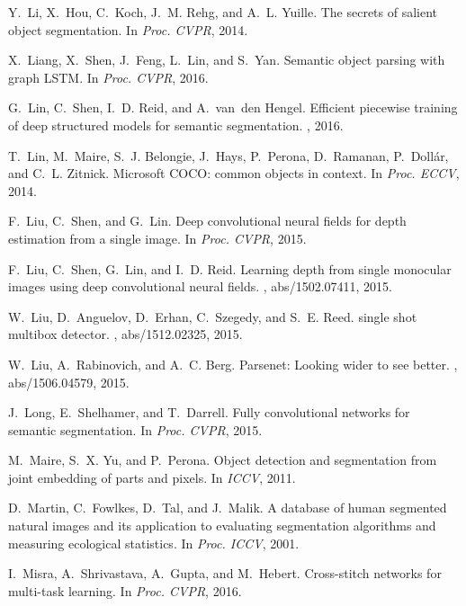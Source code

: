 \documentclass[10pt,twocolumn,letterpaper]{article}
\begin{document}
\begin{thebibliography}{100}
	Y.~Li, X.~Hou, C.~Koch, J.~M. Rehg, and A.~L. Yuille.
	\newblock The secrets of salient object segmentation.
	\newblock In {\em Proc. {CVPR}}, 2014.
	
	X.~Liang, X.~Shen, J.~Feng, L.~Lin, and S.~Yan.
	\newblock Semantic object parsing with graph {LSTM}.
	\newblock In {\em Proc. {CVPR}}, 2016.
	
	G.~Lin, C.~Shen, I.~D. Reid, and A.~van~den Hengel.
	\newblock Efficient piecewise training of deep structured models for semantic
	segmentation.
	, 2016.
	
	T.~Lin, M.~Maire, S.~J. Belongie, J.~Hays, P.~Perona, D.~Ramanan,
	P.~Doll{\'{a}}r, and C.~L. Zitnick.
	\newblock Microsoft {COCO:} common objects in context.
	\newblock In {\em Proc. {ECCV}}, 2014.
	
	F.~Liu, C.~Shen, and G.~Lin.
	\newblock Deep convolutional neural fields for depth estimation from a single
	image.
	\newblock In {\em Proc. {CVPR}}, 2015.
	
	F.~Liu, C.~Shen, G.~Lin, and I.~D. Reid.
	\newblock Learning depth from single monocular images using deep convolutional
	neural fields.
	, abs/1502.07411, 2015.
	
	W.~Liu, D.~Anguelov, D.~Erhan, C.~Szegedy, and S.~E. Reed.
	 single shot multibox detector.
	, abs/1512.02325, 2015.
	
	W.~Liu, A.~Rabinovich, and A.~C. Berg.
	\newblock Parsenet: Looking wider to see better.
	, abs/1506.04579, 2015.
	
	J.~Long, E.~Shelhamer, and T.~Darrell.
	\newblock Fully convolutional networks for semantic segmentation.
	\newblock In {\em Proc. {CVPR}}, 2015.
	
	M.~Maire, S.~X. Yu, and P.~Perona.
	\newblock Object detection and segmentation from joint embedding of parts and
	pixels.
	\newblock In {\em ICCV}, 2011.
	
	D.~Martin, C.~Fowlkes, D.~Tal, and J.~Malik.
	\newblock A database of human segmented natural images and its application to
	evaluating segmentation algorithms and measuring ecological statistics.
	\newblock In {\em Proc. {ICCV}}, 2001.
	
	I.~Misra, A.~Shrivastava, A.~Gupta, and M.~Hebert.
	\newblock Cross-stitch networks for multi-task learning.
	\newblock In {\em Proc. {CVPR}}, 2016.
	

\end{thebibliography}
\end{document}
